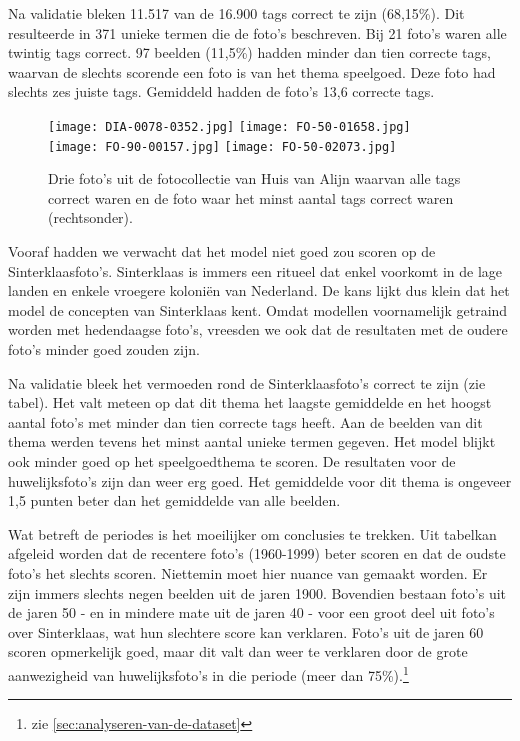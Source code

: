 Na validatie bleken 11.517 van de 16.900 tags correct te zijn (68,15\%). Dit resulteerde in 371 unieke termen die de foto’s beschreven. Bij 21 foto’s waren alle twintig tags correct. 97 beelden (11,5\%) hadden minder dan tien correcte tags, waarvan de slechts scorende een foto is van het thema speelgoed. Deze foto had slechts zes juiste tags. Gemiddeld hadden de foto’s 13,6 correcte tags.

\begin{figure}
	\centering
	\texttt{[image: DIA-0078-0352.jpg]}\hfill
	\texttt{[image: FO-50-01658.jpg]}\hfill
	\\[\smallskipamount]
	\texttt{[image: FO-90-00157.jpg]}\hfill
	\texttt{[image: FO-50-02073.jpg]}\hfill
	\caption[Enkele voorbeelden van foto's die goed of slecht getagged werden door het ingbouwde Clarifai-model]{Drie foto’s uit de fotocollectie van Huis van Alijn waarvan alle tags correct waren en de foto waar het minst aantal tags correct waren (rechtsonder).}
\end{figure}

Vooraf hadden we verwacht dat het model niet goed zou scoren op de Sinterklaasfoto’s. Sinterklaas is immers een ritueel dat enkel voorkomt in de lage landen en enkele vroegere koloniën van Nederland. De kans lijkt dus klein dat het model de concepten van Sinterklaas kent. Omdat modellen voornamelijk getraind worden met hedendaagse foto’s, vreesden we ook dat de resultaten met de oudere foto’s minder goed zouden zijn.

Na validatie bleek het vermoeden rond de Sinterklaasfoto’s correct te zijn (zie tabel). Het valt meteen op dat dit thema het laagste gemiddelde en het hoogst aantal foto’s met minder dan tien correcte tags heeft. Aan de beelden van dit thema werden tevens het minst aantal unieke termen gegeven. Het model blijkt ook minder goed op het speelgoedthema te scoren. De resultaten voor de huwelijksfoto’s zijn dan weer erg goed. Het gemiddelde voor dit thema is ongeveer 1,5 punten beter dan het gemiddelde van alle beelden.


Wat betreft de periodes is het moeilijker om conclusies te trekken. Uit tabelkan afgeleid worden dat de recentere foto’s (1960-1999) beter scoren en dat de oudste foto’s het slechts scoren. Niettemin moet hier nuance van gemaakt worden. Er zijn immers slechts negen beelden uit de jaren 1900. Bovendien bestaan foto’s uit de jaren 50 - en in mindere mate uit de jaren 40 - voor een groot deel uit foto’s over Sinterklaas, wat hun slechtere score kan verklaren. Foto’s uit de jaren 60 scoren opmerkelijk goed, maar dit valt dan weer te verklaren door de grote aanwezigheid van huwelijksfoto’s in die periode (meer dan 75\%).\footnote{zie \ref{sec:analyseren-van-de-dataset}}


